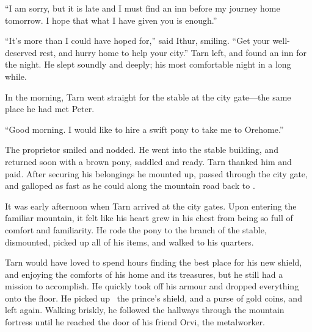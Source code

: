 ``I am sorry, but it is late and I must find an inn before my journey home tomorrow.  I hope that what I have given you is enough.''

``It's more than I could have hoped for,'' said Ithur, smiling.  ``Get your well-deserved rest, and hurry home to help your city.''  Tarn left, and found an inn for the night.  He slept soundly and deeply; his most comfortable night in a long while.

In the morning, Tarn went straight for the stable at the city gate---the same place he had met Peter.

``Good morning.  I would like to hire a swift pony to take me to Orehome.''

The proprietor smiled and nodded.  He went into the stable building, and returned soon with a brown pony, saddled and ready.  Tarn thanked him and paid.  After securing his belongings he mounted up, passed through the city gate, and galloped as fast as he could along the mountain road back to \korbarthrond.

It was early afternoon when Tarn arrived at the city gates.  Upon entering the familiar mountain, it felt like his heart grew in his chest from being so full of comfort and familiarity.  He rode the pony to the \korbarthrond branch of the stable, dismounted, picked up all of his items, and walked to his quarters.

Tarn would have loved to spend hours finding the best place for his new shield, and enjoying the comforts of his home and its treasures, but he still had a mission to accomplish.  He quickly took off his armour and dropped everything onto the floor. He picked up \kildir\, the prince's shield, and a purse of gold coins, and left again.  Walking briskly, he followed the hallways through the mountain fortress until he reached the door of his friend Orvi, the metalworker.